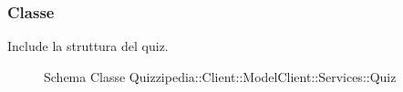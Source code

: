 \subsubsection{Classe }
Include la struttura del quiz.
\begin{figure}[H]
\centering
\noindent{}
\caption[Schema Classe Quiz]{Schema Classe Quizzipedia::Client::ModelClient::Services::Quiz}
\end{figure}
